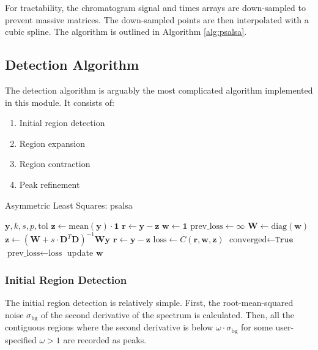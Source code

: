 \documentclass{article}
\begin{document}
For tractability, the chromatogram signal and times arrays are down-sampled to prevent massive matrices. The down-sampled points are then interpolated with a cubic spline. The algorithm is outlined in Algorithm \ref{alg:psalsa}.

\subsection{Detection Algorithm}\label{sec:detectionalg}
The detection algorithm is arguably the most complicated algorithm implemented in this module. It consists of:
\begin{enumerate}
\item Initial region detection
\item Region expansion
\item Region contraction
\item Peak refinement
\end{enumerate}

\begin{algorithm}[ht]
\caption{Asymmetric Least Squares: psalsa}\label{alg:psalsa}
\begin{algorithmic}
\Require $ \mathbf{y}, k, s, p, \text{tol}$
\State $\mathbf{z} \gets \text{mean}(\mathbf{y}) \cdot \mathbf{1}$
\State $\mathbf{r} \gets \mathbf{y} - \mathbf{z}$
\State $\mathbf{w} \gets \mathbf{1}$ 
\State $\text{prev\_loss} \gets \infty$
\State $\mathbf{W} \gets \text{diag}(\mathbf{w})$ 
\State $\mathbf{z} \gets (\mathbf{W} + s \cdot \mathbf{D}^T\mathbf{D})^{-1}\mathbf{W}\mathbf{y}$ 
\State $\mathbf{r} \gets \mathbf{y} - \mathbf{z}$ 
\State $\text{loss} \gets C(\mathbf{r},\mathbf{w},\mathbf{z})$ 
 
    \State $\text{converged} \gets \texttt{True}$
\EndIf
\State $\text{prev\_loss} \gets \text{loss}$
\State update $\mathbf{w}$ 
\EndWhile
\end{algorithmic}
\end{algorithm}

\subsubsection{Initial Region Detection}
The initial region detection is relatively simple. First, the root-mean-squared noise $\sigma_{\text{bg}}$ of the second derivative of the spectrum is calculated. Then, all the contiguous regions where the second derivative is below $\omega \cdot \sigma_{\text{bg}}$ for some user-specified $\omega >1$ are recorded as peaks. 
\end{document}
